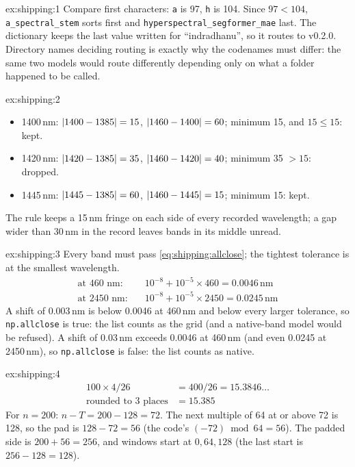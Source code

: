 
\begin{solution}{ex:shipping:1}
Compare first characters: \texttt{a} is 97, \texttt{h} is 104. Since $97 < 104$, \texttt{a\_spectral\_stem} sorts first and
\texttt{hyperspectral\_segformer\_mae} last. The dictionary keeps the last value written for ``indradhanu'', so it routes to
v0.2.0. Directory names deciding routing is exactly why the codenames must differ: the same two models would route
differently depending only on what a folder happened to be called.
\end{solution}

\begin{solution}{ex:shipping:2}
\begin{itemize}
\item 1400\,nm: $\left\lvert 1400 - 1385 \right\rvert = 15$, $\left\lvert 1460 - 1400 \right\rvert = 60$; minimum 15, and $15 \le 15$: kept.
\item 1420\,nm: $\left\lvert 1420 - 1385 \right\rvert = 35$, $\left\lvert 1460 - 1420 \right\rvert = 40$; minimum 35 $> 15$: dropped.
\item 1445\,nm: $\left\lvert 1445 - 1385 \right\rvert = 60$, $\left\lvert 1460 - 1445 \right\rvert = 15$; minimum 15: kept.
\end{itemize}
The rule keeps a 15\,nm fringe on each side of every recorded wavelength; a gap wider than 30\,nm in the record leaves
bands in its middle unread.
\end{solution}

\begin{solution}{ex:shipping:3}
Every band must pass \eqref{eq:shipping:allclose}; the tightest tolerance is at the smallest wavelength.
\begin{align*}
\text{at 460 nm:}\quad & 10^{-8} + 10^{-5} \times 460 = 0.0046\,\text{nm}\\
\text{at 2450 nm:}\quad & 10^{-8} + 10^{-5} \times 2450 = 0.0245\,\text{nm}
\end{align*}
A shift of 0.003\,nm is below 0.0046 at 460\,nm and below every larger tolerance, so \texttt{np.allclose} is true: the list
counts as the grid (and a native-band model would be refused). A shift of 0.03\,nm exceeds 0.0046 at 460\,nm (and even
0.0245 at 2450\,nm), so \texttt{np.allclose} is false: the list counts as native.
\end{solution}

\begin{solution}{ex:shipping:4}
\begin{align*}
100 \times 4 / 26 &= 400 / 26 = 15.3846\ldots\\
\text{rounded to 3 places} &= 15.385
\end{align*}
For $n = 200$: $n - T = 200 - 128 = 72$. The next multiple of 64 at or above 72 is 128, so the pad is $128 - 72 = 56$ (the
code's $(-72) \bmod 64 = 56$). The padded side is $200 + 56 = 256$, and windows start at $0, 64, 128$ (the last start is
$256 - 128 = 128$).
\end{solution}

